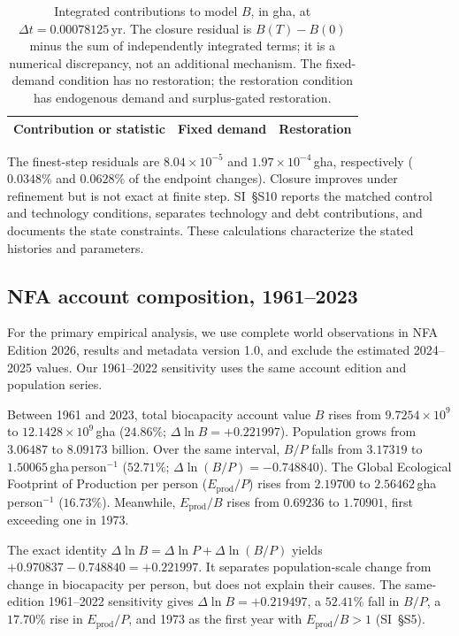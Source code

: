 \documentclass[preprint,12pt,authoryear]{elsarticle}
\begin{document}
\begin{table}[htbp]
\centering\small
\caption{Integrated contributions to model $B$, in gha, at $\Delta t=0.00078125$\,yr. The closure residual is $B(T)-B(0)$ minus the sum of independently integrated terms; it is a numerical discrepancy, not an additional mechanism. The fixed-demand condition has no restoration; the restoration condition has endogenous demand and surplus-gated restoration.}
\label{tab:c13budget}
\begin{tabular}{lrr}
\toprule
Contribution or statistic & Fixed demand & Restoration \\
\midrule

\end{tabular}
\end{table}

The finest-step residuals are $8.04\times10^{-5}$ and $1.97\times10^{-4}$\,gha, respectively ($0.0348\%$ and $0.0628\%$ of the endpoint changes). Closure improves under refinement but is not exact at finite step. SI~\S S10 reports the matched control and technology conditions, separates technology and debt contributions, and documents the state constraints. These calculations characterize the stated histories and parameters.

\subsection{NFA account composition, 1961--2023}\label{sec:empirical}

For the primary empirical analysis, we use complete world observations in NFA Edition 2026, results and metadata version 1.0, and exclude the estimated 2024--2025 values. Our 1961--2022 sensitivity uses the same account edition and population series.

Between 1961 and 2023, total biocapacity account value $B$ rises from $9.7254\times10^9$ to $12.1428\times10^9$\,gha ($24.86\%$; $\Delta\ln B=+0.221997$). Population grows from $3.06487$ to $8.09173$ billion. Over the same interval, $B/P$ falls from $3.17319$ to $1.50065$\,gha\,person$^{-1}$ ($52.71\%$; $\Delta\ln(B/P)=-0.748840$). The Global Ecological Footprint of Production per person ($E_{\mathrm{prod}}/P$) rises from $2.19700$ to $2.56462$\,gha\,person$^{-1}$ ($16.73\%$). Meanwhile, $E_{\mathrm{prod}}/B$ rises from $0.69236$ to $1.70901$, first exceeding one in 1973.

The exact identity $\Delta\ln B=\Delta\ln P+\Delta\ln(B/P)$ yields $+0.970837-0.748840=+0.221997$. It separates population-scale change from change in biocapacity per person, but does not explain their causes. The same-edition 1961--2022 sensitivity gives $\Delta\ln B=+0.219497$, a $52.41\%$ fall in $B/P$, a $17.70\%$ rise in $E_{\mathrm{prod}}/P$, and 1973 as the first year with $E_{\mathrm{prod}}/B>1$ (SI~\S S5).
\end{document}
